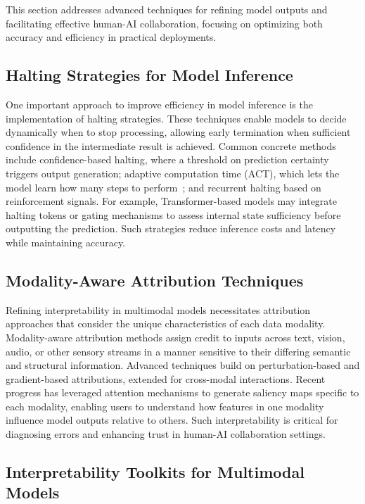 \documentclass[sigconf]{acmart}
\begin{document}
This section addresses advanced techniques for refining model outputs and facilitating effective human-AI collaboration, focusing on optimizing both accuracy and efficiency in practical deployments.

\subsection{Halting Strategies for Model Inference}

One important approach to improve efficiency in model inference is the implementation of halting strategies. These techniques enable models to decide dynamically when to stop processing, allowing early termination when sufficient confidence in the intermediate result is achieved. Common concrete methods include confidence-based halting, where a threshold on prediction certainty triggers output generation; adaptive computation time (ACT), which lets the model learn how many steps to perform~\cite{graves2016adaptive}; and recurrent halting based on reinforcement signals. For example, Transformer-based models may integrate halting tokens or gating mechanisms to assess internal state sufficiency before outputting the prediction. Such strategies reduce inference costs and latency while maintaining accuracy.

\subsection{Modality-Aware Attribution Techniques}

Refining interpretability in multimodal models necessitates attribution approaches that consider the unique characteristics of each data modality. Modality-aware attribution methods assign credit to inputs across text, vision, audio, or other sensory streams in a manner sensitive to their differing semantic and structural information. Advanced techniques build on perturbation-based and gradient-based attributions, extended for cross-modal interactions. Recent progress has leveraged attention mechanisms to generate saliency maps specific to each modality, enabling users to understand how features in one modality influence model outputs relative to others. Such interpretability is critical for diagnosing errors and enhancing trust in human-AI collaboration settings.

\subsection{Interpretability Toolkits for Multimodal Models}
\end{document}

